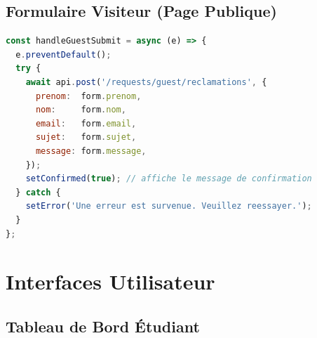 \subsection{Formulaire Visiteur (Page Publique)}

\begin{lstlisting}[language=JavaScript,
  caption=PublicReclamationForm.jsx — Soumission sans authentification]
const handleGuestSubmit = async (e) => {
  e.preventDefault();
  try {
    await api.post('/requests/guest/reclamations', {
      prenom:  form.prenom,
      nom:     form.nom,
      email:   form.email,
      sujet:   form.sujet,
      message: form.message,
    });
    setConfirmed(true); // affiche le message de confirmation
  } catch {
    setError('Une erreur est survenue. Veuillez reessayer.');
  }
};
\end{lstlisting}

\section{Interfaces Utilisateur}

\subsection{Tableau de Bord Étudiant}

